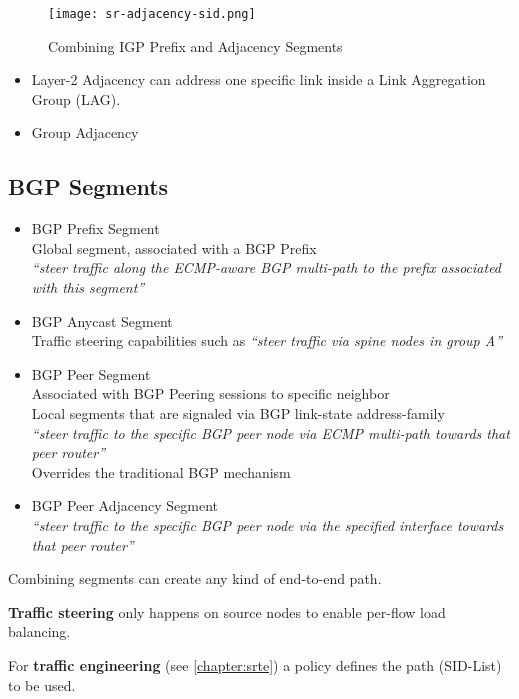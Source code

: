 \begin{figure}[h]
    \centering
    \texttt{[image: sr-adjacency-sid.png]}
    \caption{Combining IGP Prefix and Adjacency Segments}
\end{figure}

\begin{itemize}
    \item Layer-2 Adjacency can address one specific link inside a Link Aggregation Group (LAG). 
    \item Group Adjacency
\end{itemize} 

\subsection{BGP Segments}
\begin{itemize}
    \item BGP Prefix Segment \\
    Global segment, associated with a BGP Prefix \\
    \emph{``steer traffic along the ECMP-aware BGP multi-path to the prefix associated with this segment”} 
    \item BGP Anycast Segment \\
    Traffic steering capabilities such as \emph{``steer traffic via spine nodes in group A”} 
    \item BGP Peer Segment \\
    Associated with BGP Peering sessions to specific neighbor \\ 
    Local segments that are signaled via BGP link-state address-family \\
    \emph{``steer traffic to the specific BGP peer node via ECMP multi-path towards that peer router”} \\
    Overrides the traditional BGP mechanism 
    \item BGP Peer Adjacency Segment \\
    \emph{``steer traffic to the specific BGP peer node via the specified interface towards that peer router”}
\end{itemize}

\noindent
Combining segments can create any kind of end-to-end path.

\noindent
\textbf{Traffic steering} only happens on source nodes to enable per-flow load balancing.

\noindent
For \textbf{traffic engineering} (see \ref{chapter:srte}) a policy defines the path (SID-List) to be used. 

